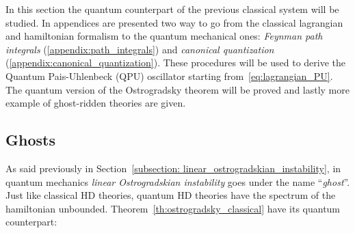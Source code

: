 In this section the quantum counterpart of the previous classical system will be
studied. In appendices are presented two way to go from the classical
lagrangian and hamiltonian formalism to the quantum mechanical ones:
\emph{Feynman path integrals} (\ref{appendix:path_integrals}) and
\emph{canonical quantization} (\ref{appendix:canonical_quantization}). These
procedures will be used to derive the Quantum Pais-Uhlenbeck (QPU) oscillator
starting from~\eqref{eq:lagrangian_PU}. The quantum version of the Ostrogradsky
theorem will be proved and lastly more example of ghost-ridden theories are
given.

\subsection{Ghosts}\label{section:ghosts}
As said previously in Section~\ref{subsection:
linear_ostrogradskian_instability}, in quantum mechanics
\emph{linear Ostrogradskian instability} goes under the name ``\emph{ghost}''.
Just like classical HD theories, quantum HD theories have the spectrum of the
hamiltonian unbounded. Theorem~\ref{th:ostrogradsky_classical} have its quantum
counterpart:


